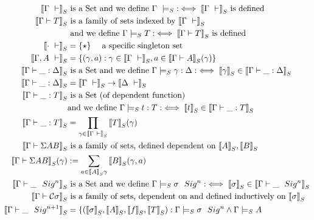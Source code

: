 \begin{align*}
  \denotesS{\goodCtx{\Gamma}{i}} & \text{ is a Set and we define } \goodCtxS{\Gamma}{i} :\iff \denotesS{\goodCtx{\Gamma}{i}} \text{ is defined} \\
  \denotesS{\goodType{\Gamma}{T}{i}} & \text{ is a family of sets indexed by } \denotesS{\goodCtx{\Gamma}{i}} \\
  & \text{ and we define } \goodTypeS{\Gamma}{T}{i} : \iff \denotesS{\goodType{\Gamma}{T}{i}} \text{ is defined } \\
  \denotesS{\goodCtx{\cdot}{i}} &= \{\star\} \quad \text{ a specific singleton set} \\
  \denotesS{\goodCtx{\Gamma, A}{i}} &= \{(\gamma, a) : \gamma \in \denotesS{\goodCtx{\Gamma}{}}, a \in \denotesS{\goodType{\Gamma}{A}{}}(\gamma)\}
  \\
  \denotesS{\goodSub{\Gamma}{\_}{\Delta}} & \text{ is a Set and we define }  {\goodSubS{\Gamma}{\gamma}{\Delta}} : \iff \denotesS{\gamma} \in \denotesS{\goodSub{\Gamma}{\_}{\Delta}} \\
  \denotesS{\goodSub{\Gamma}{\_}{\Delta}} & = \denotesS{\goodCtx{\Gamma}{i}} \rightarrow \denotesS{\goodCtx{\Delta}{j}} \\
  \denotesS{\goodTerm{\Gamma}{\_}{T}} & \text{ is a Set (of dependent function) } \\& \text{and we define }  {\goodTermS{\Gamma}{t}{T}} : \iff \denotesS{t} \in \denotesS{\goodTerm{\Gamma}{\_}{T}} \\
  \denotesS{\goodTerm{\Gamma}{\_}{T}} & = \prod_{\gamma \in \denotesS{\goodCtx{\Gamma}{i}}}\denotesS{T}(\gamma) \\
  \denotesS{\goodType{\Gamma}{\Sigma A B}{}} &\text{ is a family of sets, defined dependent on } \denotesS{A}, \denotesS{B} \\
  \denotesS{\goodType{\Gamma}{\Sigma A B}{}}(\gamma) &:= \sum_{a \in \denotesS{A}\gamma} \denotesS{B}(\gamma, a) \\
  \denotesS{\goodSig{\Gamma}{\_}{n}} & \text{ is a Set  and we define  } {\goodSigS{\Gamma}{\sigma}{n}} :\iff \denotesS{\sigma} \in  \denotesS{\goodSig{\Gamma}{\_}{n}} \\
  \denotesS{\goodType{\Gamma}{\cC \sigma}{}} & \text{ is a family of sets, dependent on and defined inductively on } \denotesS{\sigma} \\   
  \denotesS{\goodSig{\Gamma}{\_}{n+1}} &= \{
    (\denotesS{\sigma}, \denotesS{A}, \denotesS{f}, \denotesS{T}) :
      {\goodSigS{\Gamma}{\sigma}{n}}
      \land  {\goodTypeS{\Gamma}{A}{}} \\  

\end{align*}

